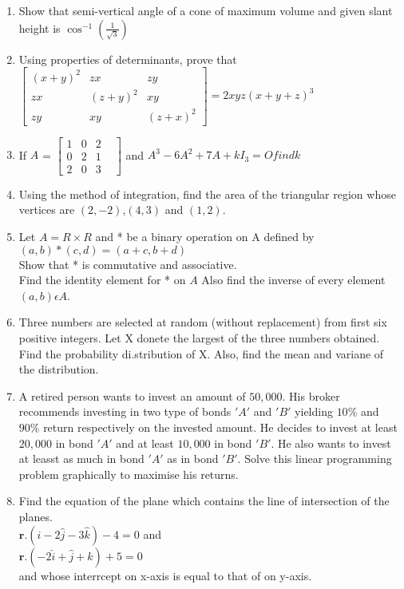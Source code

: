 \documentclass[12pt,-letter paper]{article}
\let\vec\mathbf{}
\let\vec\mathbf{}
\let\vec\mathbf{}
\providecommand{\myvec}[1]{\ensuremath{\begin{bmatrix}#1\end{bmatrix}}}
\providecommand{\brak}[1]{\ensuremath{\left(#1\right)}}
\begin{document}
\begin{enumerate}
\item Show that semi-vertical angle of a cone of maximum volume and given slant height is $\cos^{-1}\brak{\frac{1}{\sqrt{3}}}$
\item Using properties of determinants, prove that \\
$\myvec{\brak{x+y}^2 & zx & zy \\zx & \brak{z+y}^2 & xy \\zy & xy & \brak{z+x}^2} = 2xyz\brak{x+y+z}^3$
\item If $A$ = $\myvec{1&0&2&\\0&2&1\\2&0&3&}$ and $A^3-6A^2+7A+kI_3 = O find k$
\item Using the method of integration, find the area of the triangular region whose vertices are $\brak{2, -2}$,$\brak{4, 3}$ and $\brak{1, 2}$.
\item Let $A=R \times R$ and * be a binary operation on A defined by \\ $\brak{a, b}*\brak{c, d}=\brak{a+c, b+d}$ \\ Show that * is commutative and associative. \\ Find the identity element for * on $A$ Also find the inverse of every element $\brak{a, b}\epsilon A$.
\item Three numbers are selected at random (without replacement) from first six positive integers. Let X donete the largest of the three numbers obtained. Find the probability di.stribution of X. Also, find the mean and variane of the distribution.
\item A retired person wants to invest an amount of \rupee $50,000$. His broker recommends investing in two type of bonds $'A'$ and $'B'$ yielding $10\%$ and $90\%$ return respectively on the invested amount. He decides to invest at least \rupee $20,000$ in bond $'A'$ and at least \rupee $10,000$ in bond $'B'$. He also wants to invest at leasst as much in bond $'A'$ as in bond $'B'$. Solve this linear  programming problem graphically to maximise his returns. 
\item Find the equation of the plane which contains the line of intersection of the planes. \\ $\vec{r}$.$\brak{\hat{i}-2\hat{j}-3\hat{k}}-4=0$ and \\ $ \vec{r}$.$\brak{-2\hat{i}+\hat{j}+\hat{k}}+5=0$ \\ and whose interrcept on x-axis is equal to that of on y-axis.	

\end{enumerate}
\end{document}
